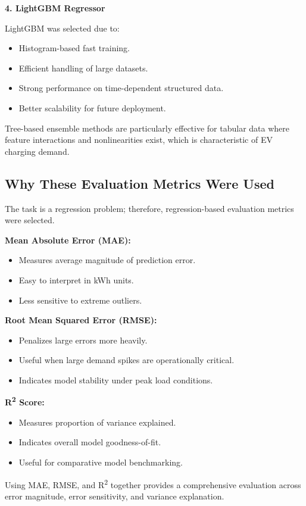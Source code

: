 \documentclass[12pt,a4paper]{article}
\begin{document}
\begin{itemize}
\textbf{4. LightGBM Regressor}

LightGBM was selected due to:

\begin{itemize}
    \item Histogram-based fast training.
    \item Efficient handling of large datasets.
    \item Strong performance on time-dependent structured data.
    \item Better scalability for future deployment.
\end{itemize}

Tree-based ensemble methods are particularly effective for tabular data where feature interactions and nonlinearities exist, which is characteristic of EV charging demand.

\subsection{Why These Evaluation Metrics Were Used}

The task is a regression problem; therefore, regression-based evaluation metrics were selected.

\textbf{Mean Absolute Error (MAE):}

\begin{itemize}
    \item Measures average magnitude of prediction error.
    \item Easy to interpret in kWh units.
    \item Less sensitive to extreme outliers.
\end{itemize}

\textbf{Root Mean Squared Error (RMSE):}

\begin{itemize}
    \item Penalizes large errors more heavily.
    \item Useful when large demand spikes are operationally critical.
    \item Indicates model stability under peak load conditions.
\end{itemize}

\textbf{R\textsuperscript{2} Score:}

\begin{itemize}
    \item Measures proportion of variance explained.
    \item Indicates overall model goodness-of-fit.
    \item Useful for comparative model benchmarking.
\end{itemize}

Using MAE, RMSE, and R\textsuperscript{2} together provides a comprehensive evaluation across error magnitude, error sensitivity, and variance explanation.
\end{itemize}
\end{document}
